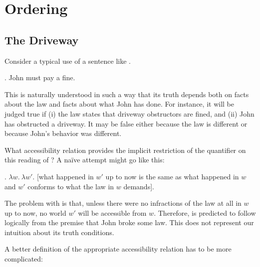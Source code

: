 \chapter{Ordering}\label{cha:ordering} %


\minitoc

\section{The Driveway}

Consider a typical use of a sentence like \Next.

\ex. \label{drivewayfine}John must pay a fine.

This is naturally understood in such a way that its truth depends both on facts about the law and facts about what John has done. For instance, it will be judged true if (i) the law states that driveway obstructors are fined, and (ii) John has obstructed a driveway. It may be false either because the law is different or because John's behavior was different.

What accessibility relation provides the implicit restriction of the quantifier  on this reading of \Last? A naïve attempt might go like this:

\ex. $\lambda w.\ \lambda w'.$ [what happened in $w'$ up to now is the same as what happened in $w$ and $w'$ conforms to what the law in $w$ demands].

The problem with \Last is that, unless there were no infractions of the law at all in $w$ up to now, no world $w'$ will be accessible from $w$. Therefore, \LLast is predicted to follow logically from the premise that John broke some law. This does not represent our intuition about its truth conditions.

A better definition of the appropriate accessibility relation has to be more complicated:

